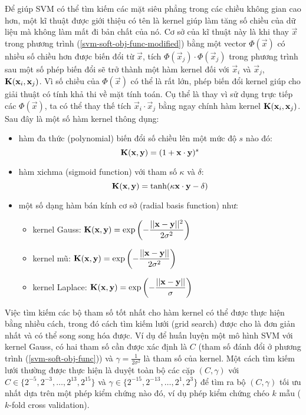 Để giúp SVM có thể tìm kiếm các mặt siêu phẳng trong các chiều không gian cao hơn, một kĩ thuật được giới thiệu có tên là kernel giúp làm tăng số chiều của dữ liệu mà không làm mất đi bản chất của nó. Cơ sở của kĩ thuật này là khi thay $\vec{x}$ trong phương trình (\ref{svm-soft-obj-func-modified}) bằng một vector $\Phi(\vec{x})$ có nhiều số chiều hơn được biến đổi từ $\vec{x}$, tích $\Phi(\vec{x}_j)\cdot\Phi(\vec{x}_j)$ trong phương trình sau một số phép biến đổi sẽ trở thành một hàm kernel đối với $\vec{x}_i$ và $\vec{x}_j$, $\operatorname{\mathbf{K}}(\mathbf{x}_i,\mathbf{x}_j)$. Vì số chiều của $\Phi(\vec{x})$ có thể là rất lớn, phép biến đổi kernel giúp cho giải thuật có tính khả thi về mặt tính toán. Cụ thể là thay vì sử dụng trực tiếp các $\Phi(\vec{x})$, ta có thể thay thế tích $\vec{x}_i\cdot\vec{x}_j$ bằng ngay chính hàm kernel $\operatorname{\mathbf{K}}(\mathbf{x}_i,\mathbf{x}_j)$. Sau đây là một số hàm kernel thông dụng:

\begin{itemize}
\item hàm đa thức (polynomial) biến đổi số chiều lên một mức độ $s$ nào đó:
\[\operatorname{\mathbf{K}}(\mathbf{x},\mathbf{y})=(1+\mathbf{x}\cdot\mathbf{y})^s\]
\item hàm xichma (sigmoid function) với tham số $\kappa$ và $\delta$:
\[\operatorname{\mathbf{K}}(\mathbf{x},\mathbf{y})=\tanh(\kappa \mathbf{x}\cdot \mathbf{y}-\delta)\]
\item một số dạng hàm bán kính cơ sở (radial basis function) như:
\begin{itemize}
\item kernel Gauss: $\operatorname{\mathbf{K}}(\mathbf{x},\mathbf{y})=\exp\left(-\dfrac{||\mathbf{x}-\mathbf{y}||^2}{2\sigma^2}\right)$
\item kernel mũ: $\operatorname{\mathbf{K}}(\mathbf{x},\mathbf{y})=\exp\left(-\dfrac{||\mathbf{x}-\mathbf{y}||}{2\sigma^2}\right)$
\item kernel Laplace: $\operatorname{\mathbf{K}}(\mathbf{x},\mathbf{y})=\exp\left(-\dfrac{||\mathbf{x}-\mathbf{y}||}{\sigma}\right)$
\end{itemize}
\end{itemize}

Việc tìm kiếm các bộ tham số tốt nhất cho hàm kernel có thể được thực hiện bằng nhiều cách, trong đó cách tìm kiếm lưới (grid search) được cho là đơn giản nhất và có thể song song hóa được. Ví dụ để huấn luyện một mô hình SVM với kernel Gauss, có hai tham số cần được xác định là $C$ (tham số đánh đổi ở phương trình (\ref{svm-soft-obj-func})) và $\gamma=\frac{1}{2\sigma^2}$ là tham số của kernel. Một cách tìm kiếm lưới thường được thực hiện là duyệt toàn bộ các cặp $(C,\gamma)$ với $C\in\{2^{-5},2^{-3},\dots,2^{13},2^{15}\}$ và $\gamma\in\{2^{-15},2^{-13},\dots,2^1,2^3\}$ để tìm ra bộ $(C,\gamma)$ tối ưu nhất dựa trên một phép kiểm chứng nào đó, ví dụ phép kiểm chứng chéo $k$ mẫu ($k$-fold cross validation).

